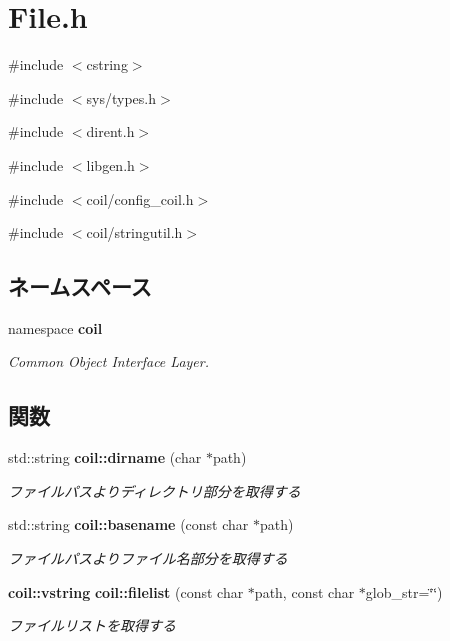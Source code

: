 \section{File.h}
\label{File_8h}
{\ttfamily \#include $<$cstring$>$}\par
{\ttfamily \#include $<$sys/types.h$>$}\par
{\ttfamily \#include $<$dirent.h$>$}\par
{\ttfamily \#include $<$libgen.h$>$}\par
{\ttfamily \#include $<$coil/config\_\-coil.h$>$}\par
{\ttfamily \#include $<$coil/stringutil.h$>$}\par
\subsection*{ネームスペース}
\begin{DoxyCompactItemize}
\item 
namespace {\bf coil}


\begin{DoxyCompactList}\small\item\em Common Object Interface Layer. \item\end{DoxyCompactList}

\end{DoxyCompactItemize}
\subsection*{関数}
\begin{DoxyCompactItemize}
\item 
std::string {\bf coil::dirname} (char $\ast$path)
\begin{DoxyCompactList}\small\item\em ファイルパスよりディレクトリ部分を取得する \item\end{DoxyCompactList}\item 
std::string {\bf coil::basename} (const char $\ast$path)
\begin{DoxyCompactList}\small\item\em ファイルパスよりファイル名部分を取得する \item\end{DoxyCompactList}\item 
{\bf coil::vstring} {\bf coil::filelist} (const char $\ast$path, const char $\ast$glob\_\-str=\char`\"{}\char`\"{})
\begin{DoxyCompactList}\small\item\em ファイルリストを取得する \item\end{DoxyCompactList}\end{DoxyCompactItemize}
